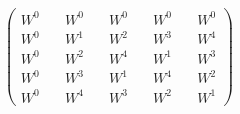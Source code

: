 $ \begin{pmatrix} W^0 \quad & W^0 \quad & W^0 \quad & W^0 \quad & W^0  \\[6pt] W^0 \quad & W^1 \quad & W^2 \quad & W^3 \quad & W^4  \\[6pt] W^0 \quad & W^2 \quad & W^4 \quad & W^1 \quad & W^3  \\[6pt] W^0 \quad & W^3 \quad & W^1 \quad & W^4 \quad & W^2 \\[6pt] W^0 \quad & W^4 \quad & W^3 \quad & W^2 \quad & W^1 \end{pmatrix}$
